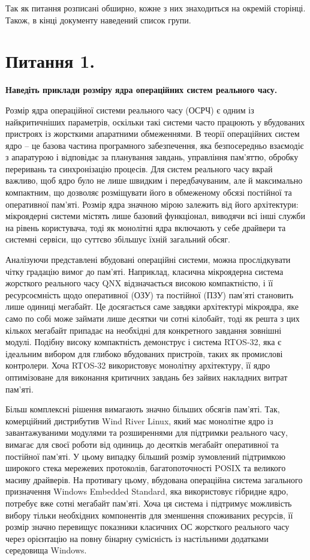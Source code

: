 \documentclass[14pt, a4paper]{extreport}
\begin{document}
	Так як питання розписані обширно, кожне з них знаходиться на окремій сторінці. Також, в кінці документу наведений список групи.
	
	\pagebreak
	
	\section*{Питання 1.}
	
	\textbf{Наведіть приклади розміру ядра операційних систем реального часу.} 
	
	Розмір ядра операційної системи реального часу (ОСРЧ) є одним із найкритичніших параметрів, оскільки такі системи часто працюють у вбудованих пристроях із жорсткими апаратними обмеженнями. В теорії операційних систем ядро -- це базова частина програмного забезпечення, яка безпосередньо взаємодіє з апаратурою і відповідає за планування завдань, управління пам'яттю, обробку переривань та синхронізацію процесів. Для систем реального часу вкрай важливо, щоб ядро було не лише швидким і передбачуваним, але й максимально компактним, що дозволяє розміщувати його в обмеженому обсязі постійної та оперативної пам'яті. Розмір ядра значною мірою залежить від його архітектури: мікроядерні системи містять лише базовий функціонал, виводячи всі інші служби на рівень користувача, тоді як монолітні ядра включають у себе драйвери та системні сервіси, що суттєво збільшує їхній загальний обсяг.
	
	Аналізуючи представлені вбудовані операційні системи, можна прослідкувати чітку градацію вимог до пам'яті. Наприклад, класична мікроядерна система жорсткого реального часу QNX відзначається високою компактністю, і її ресурсоємність щодо оперативної (ОЗУ) та постійної (ПЗУ) пам'яті становить лише одиниці мегабайт. Це досягається саме завдяки архітектурі мікроядра, яке само по собі може займати лише десятки чи сотні кілобайт, тоді як решта з цих кількох мегабайт припадає на необхідні для конкретного завдання зовнішні модулі. Подібну високу компактність демонструє і система RTOS-32, яка є ідеальним вибором для глибоко вбудованих пристроїв, таких як промислові контролери. Хоча RTOS-32 використовує монолітну архітектуру, її ядро оптимізоване для виконання критичних завдань без зайвих накладних витрат пам'яті.  
	
	Більш комплексні рішення вимагають значно більших обсягів пам'яті. Так, комерційний дистрибутив Wind River Linux, який має монолітне ядро із завантажуваними модулями та розширеннями для підтримки реального часу, вимагає для своєї роботи від одиниць до десятків мегабайт оперативної та постійної пам'яті. У цьому випадку більший розмір зумовлений підтримкою широкого стека мережевих протоколів, багатопоточності POSIX та великого масиву драйверів. На противагу цьому, вбудована операційна система загального призначення Windows Embedded Standard, яка використовує гібридне ядро, потребує вже сотні мегабайт пам'яті. Хоча ця система і підтримує можливість вибору тільки необхідних компонентів для зменшення споживаних ресурсів, її розмір значно перевищує показники класичних ОС жорсткого реального часу через орієнтацію на повну бінарну сумісність із настільними додатками середовища Windows.  
	
\end{document}
